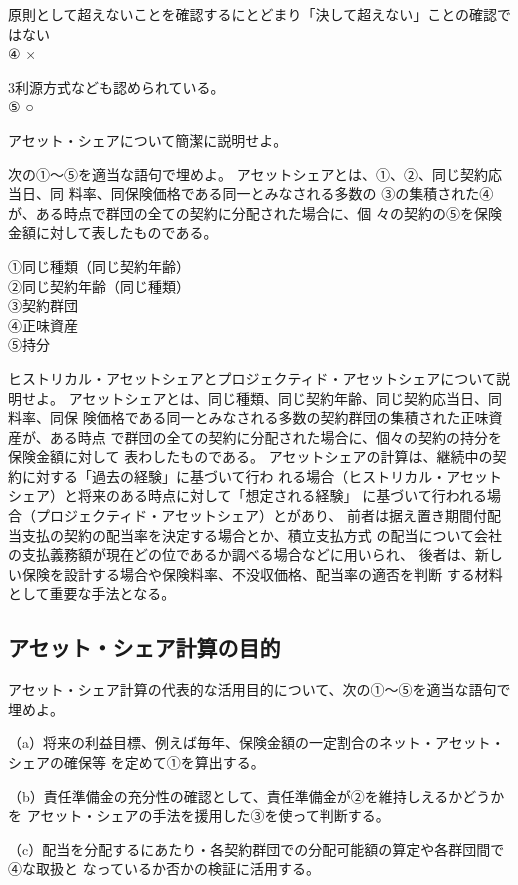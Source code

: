 \documentclass[report,gutter=10mm,fore-edge=10mm,uplatex,dvipdfmx]{jlreq}
\begin{document}
原則として超えないことを確認するにとどまり「決して超えない」ことの確認ではない\\
④ ×

3利源方式なども認められている。\\
⑤ ○

アセット・シェアについて簡潔に説明せよ。

次の①〜⑤を適当な語句で埋めよ。
アセットシェアとは、①、②、同じ契約応当日、同
料率、同保険価格である同一とみなされる多数の
③の集積された④が、ある時点で群団の全ての契約に分配された場合に、個
々の契約の⑤を保険金額に対して表したものである。

\answer{}
\noindent
①同じ種類（同じ契約年齢）\\
②同じ契約年齢（同じ種類）\\
③契約群団\\
④正味資産\\
⑤持分

ヒストリカル・アセットシェアとプロジェクティド・アセットシェアについて説明せよ。
\answer{}
アセットシェアとは、同じ種類、同じ契約年齢、同じ契約応当日、同料率、同保
険価格である同一とみなされる多数の契約群団の集積された正味資産が、ある時点
で群団の全ての契約に分配された場合に、個々の契約の持分を保険金額に対して
表わしたものである。
アセットシェアの計算は、継続中の契約に対する「過去の経験」に基づいて行わ
れる場合（ヒストリカル・アセットシェア）と将来のある時点に対して「想定される経験」
に基づいて行われる場合（プロジェクティド・アセットシェア）とがあり、
前者は据え置き期間付配当支払の契約の配当率を決定する場合とか、積立支払方式
の配当について会社の支払義務額が現在どの位であるか調べる場合などに用いられ、
後者は、新しい保険を設計する場合や保険料率、不没収価格、配当率の適否を判断
する材料として重要な手法となる。

\subsection{アセット・シェア計算の目的}

アセット・シェア計算の代表的な活用目的について、次の①～⑤を適当な語句で埋めよ。

（a）将来の利益目標、例えば毎年、保険金額の一定割合のネット・アセット・シェアの確保等
を定めて①を算出する。

（b）責任準備金の充分性の確認として、責任準備金が②を維持しえるかどうかを
アセット・シェアの手法を援用した③を使って判断する。

（c）配当を分配するにあたり・各契約群団での分配可能額の算定や各群団間で④な取扱と
なっているか否かの検証に活用する。
\end{document}
